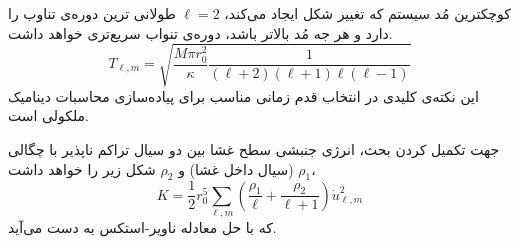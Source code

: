 کوچکترین مُد سیستم که تغییر شکل ایجاد می‌کند،
$\ell=2$
طولانی ترین دوره‌ی تناوب را دارد و هر جه مُد بالاتر باشد، دوره‌ی تنواب سریع‌تری خواهد داشت.
\begin{equation}
T_{\ell,m}=\sqrt{\frac{M\pi r_0^2}{\kappa}\frac{1}{(\ell+2)(\ell+1)\ell(\ell-1)}}
\end{equation}
این نکته‌ی کلیدی در انتخاب قدم زمانی مناسب برای پیاده‌سازی محاسبات دینامیک ملکولی است.

جهت تکمیل کردن بحث، انرژی جنبشی سطح غشا بین دو سیال تراکم ناپذیر با چگالی 
$\rho_1$
(سیال داخل غشا) و 
$\rho_2$
شکل زیر را خواهد داشت،
\cite{Christer1984}
\begin{equation}
K=\frac{1}{2}r_0^5\sum_{\ell,m}\left(\frac{\rho_1}{\ell}+\frac{\rho_2}{\ell+1}\right)\dot u_{\ell,m}^2
\end{equation}
که با حل معادله ناویر-استکس به دست می‌آید.







